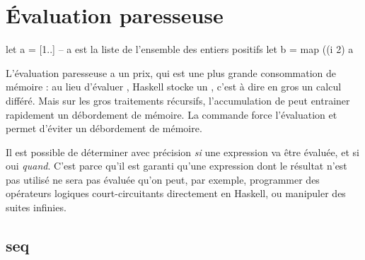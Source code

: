 \section{Évaluation paresseuse}
\label{lazyness}

\begin{haskellcode}
let a = [1..] -- a est la liste de l'ensemble des entiers positifs
let b = map ((^^) 2) a
\end{haskellcode}

L'évaluation paresseuse a un prix, qui est une plus grande consommation de mémoire : au lieu d'évaluer , Haskell stocke un , c'est à dire en gros un calcul différé. Mais sur les gros traitements récursifs, l'accumulation de  peut entrainer rapidement un débordement de mémoire. La commande  force l'évaluation et permet d'éviter un débordement de mémoire.

\begin{infobox}
Il est possible de déterminer avec précision \emph{si} une expression va être évaluée, et si oui \emph{quand}. C'est parce qu'il est garanti qu'une expression dont le résultat n'est pas utilisé ne sera pas évaluée qu'on peut, par exemple, programmer des opérateurs logiques court-circuitants directement en Haskell, ou manipuler des suites infinies.
\end{infobox}

\subsection[]{seq}
